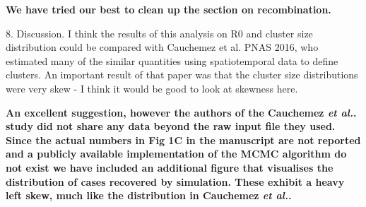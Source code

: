 \documentclass[11pt,oneside,letterpaper]{article}
\begin{document}
\textbf{We have tried our best to clean up the section on recombination.}

8. Discussion. I think the results of this analysis on R0 and cluster size distribution could be compared with Cauchemez et al. PNAS 2016, who estimated many of the similar quantities using spatiotemporal data to define clusters. An important result of that paper was that the cluster size distributions were very skew - I think it would be good to look at skewness here.

\textbf{An excellent suggestion, however the authors of the Cauchemez \textit{et al.}. study did not share any data beyond the raw input file they used. Since the actual numbers in Fig 1C in the manuscript are not reported and a publicly available implementation of the MCMC algorithm do not exist we have included an additional figure that visualises the distribution of cases recovered by simulation. These exhibit a heavy left skew, much like the distribution in Cauchemez \textit{et al.}.}

% 
\end{document}
